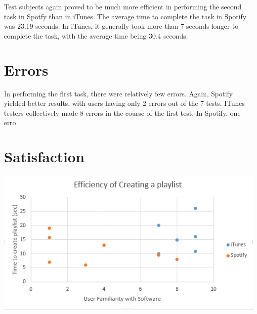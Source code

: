 \documentclass[12pt]{report}
\begin{document}
Test subjects again proved to be much more efficient in performing the second task in Spotfy than in iTunes. The average time to complete the task in Spotify was 23.19 seconds. In iTunes, it generally took more than 7 seconds longer to complete the task, with the average time being 30.4 seconds.

\section{Errors}

In performing the first task, there were relatively few errors. Again, Spotify yielded better results, with users having only 2 errors out of the 7 tests. ITunes testers collectively made 8 errors in the course of the first test. In Spotify, one erro

\section{Satisfaction}

\includegraphics[width=\textwidth]{chart1.png}
\end{document}
